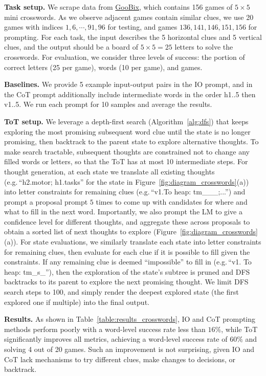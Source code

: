 \textbf{Task setup.} We scrape data from \href{https://www.goobix.com/crosswords/0505/}{GooBix}, which contains 156 games of $5\times 5$ mini crosswords. As we observe adjacent games contain similar clues, we use 20 games with indices $1, 6, \cdots, 91, 96$ for testing, and games $136, 141,146,151,156$ for prompting. For each task, the input describes the 5 horizontal clues and 5 vertical clues, and the output should be a board of $5 \times 5 = 25$ letters to solve the crosswords. For evaluation, we consider three levels of success: the portion of correct letters (25 per game), words (10 per game), and games. 

\textbf{Baselines.} We provide 5 example input-output pairs in the IO prompt, and in the CoT prompt additionally include intermediate words in the order h1..5 then v1..5. We run each prompt for 10 samples and average the results.

\textbf{ToT setup.} We leverage a depth-first search (Algorithm~\ref{alg:dfs}) that keeps exploring the most promising subsequent word clue until the state is no longer promising, then backtrack to the parent state to explore alternative thoughts. To make search tractable, subsequent thoughts are constrained not to change any filled words or letters, so that the ToT has at most 10 intermediate steps. For thought generation, at each state we translate all existing thoughts (e.g.\,``h2.motor; h1.tasks'' for the state in Figure~\ref{fig:diagram_crosswords}(a)) into letter constraints for remaining clues (e.g.\,``v1.To heap: tm\_\_\_;...'') and  prompt a proposal prompt $5$ times to come up with candidates for where and what to fill in the next word. Importantly, we also prompt the LM to give a confidence level for different thoughts, and aggregate these across proposals to obtain a sorted list of next thoughts to explore (Figure~\ref{fig:diagram_crosswords}(a)).
For state evaluations, we similarly translate each state into letter constraints for remaining clues, then evaluate for each clue if it is possible to fill given the constraints. If any remaining clue is deemed ``impossible'' to fill in (e.g.\,``v1. To heap: tm\_s\_''), then the exploration of the state's subtree is pruned and DFS backtracks to its parent to explore the next promising thought. We limit DFS search steps to 100, and simply render the deepest explored state (the first explored one if multiple) into the final output. 

\textbf{Results.} As shown in Table~\ref{table:results_crosswords}, IO and CoT prompting methods perform poorly with a word-level success rate less than $16\%$, while ToT significantly improves all metrics, achieving a word-level success rate of $60\%$ and solving 4 out of 20 games. Such an improvement is not surprising, given IO and CoT lack mechanisms to try different clues, make changes to decisions, or backtrack. 

